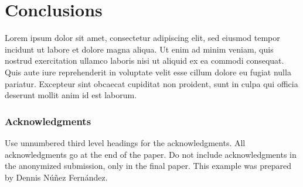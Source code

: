 \documentclass{article}
\begin{document}
\section{Conclusions}

Lorem ipsum dolor sit amet, consectetur adipiscing elit, sed eiusmod tempor incidunt ut labore et dolore magna aliqua. Ut enim ad minim veniam, quis nostrud exercitation ullamco laboris nisi ut aliquid ex ea commodi consequat. Quis aute iure reprehenderit in voluptate velit esse cillum dolore eu fugiat nulla pariatur. Excepteur sint obcaecat cupiditat non proident, sunt in culpa qui officia deserunt mollit anim id est laborum.



\subsubsection*{Acknowledgments}

Use unnumbered third level headings for the acknowledgments. All acknowledgments go at the end of the paper. Do not include acknowledgments in the anonymized submission, only in the final paper. This example was prepared by Dennis Núñez Fernández.



{}

\end{document}

